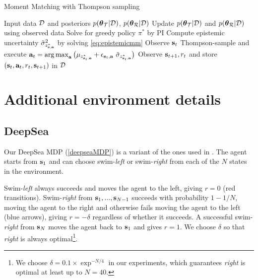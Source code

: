 \documentclass{article}
\begin{document}
\begin{appendices}
\begin{algorithm}
  \caption{Moment Matching with Thompson sampling}\label{alg:tmm}
  \begin{algorithmic}[1]
\State Input data $\mathcal{D}$ and posteriors $p(\boldsymbol{\theta}_{\mathcal{T}} | \mathcal{D})$, $p(\boldsymbol{\theta}_{\mathcal{R}} | \mathcal{D})$
	\State Update $p(\boldsymbol{\theta}_{\mathcal{T}} | \mathcal{D})$ and $p(\boldsymbol{\theta}_{\mathcal{R}} | \mathcal{D})$ using observed data
	\State Solve for greedy policy ${\pi^*}$ by PI
	\State Compute epistemic uncertainty $\tilde{\sigma}_{z^*_{\mathbf{s}, \mathbf{a}}}^2$ by solving \cref{eq:epistemicmm}
	\EndIf
 	\State Observe $\mathbf{s}_t$
	\State Thompson-sample and execute $\mathbf{a}_t = \operatorname*{arg\,max}_{\mathbf{a}} \big(\mu_{z_{\mathbf{s}_t, \mathbf{a}}^*} + \epsilon_{\mathbf{s}_t, \mathbf{a}}~\tilde{\sigma}_{z^*_{\mathbf{s}_t, \mathbf{a}}}\big)$
	\State Observe $\mathbf{s}_{t+1}, r_{t}$ and store $(\mathbf{s}_{t}, \mathbf{a}_t, r_{t}, \mathbf{s}_{t+1})$ in $\mathcal{D}$
 \EndFor
\end{algorithmic}
\end{algorithm}

\clearpage

\section{Additional environment details} \label{app:env}

\subsection{DeepSea}

Our DeepSea MDP (\cref{deepseaMDP}) is a variant of the ones used in \cite{rand_val_func, deepsea}. The agent starts from $\mathbf{s}_1$ and can choose swim-\textit{left} or swim-\textit{right} from each of the $N$ states in the environment.

Swim-\textit{left} always succeeds and moves the agent to the left, giving $r = 0$ (red transitions). Swim-\textit{right} from $\mathbf{s}_1, ..., \mathbf{s}_{N-1}$ succeeds with probability $1 - 1/N$, moving the agent to the right and otherwise fails moving the agent to the left (blue arrows), giving $r = - \delta$ regardless of whether it succeeds. A successful swim-\textit{right} from $\mathbf{s}_N$ moves the agent back to $\mathbf{s}_1$ and gives $r = 1$. We choose $\delta$ so that \textit{right} is always optimal\footnote{We choose $\delta = 0.1 \times \exp^{-N / 4}$ in our experiments, which guarantees \textit{right} is optimal at least up to $N = 40$.}.

\begin{figure}[h!]
\centering
{}
\end{figure}
\end{appendices}
\end{document}
